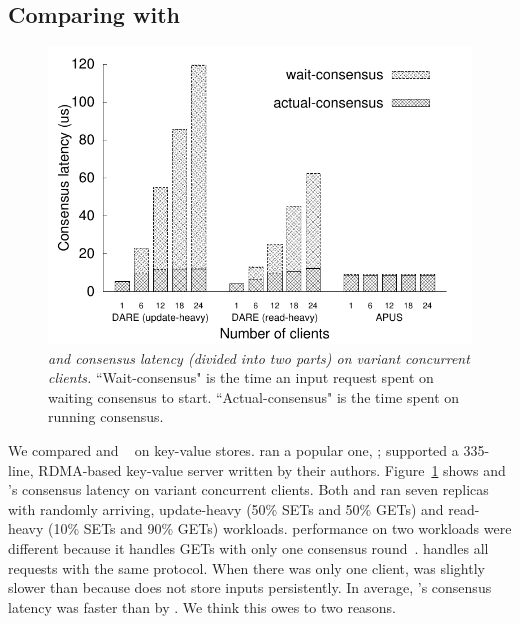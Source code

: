 \subsection{Comparing with \dare}
\label{sec:eval-dare}

\begin{figure}[b]
\centering
\vspace{-.35in}
\includegraphics[width=.4\textwidth]{figures/server-processing-compare}
\vspace{-.1in}
\caption{{\em \xxx and \dare consensus latency (divided into two parts) on 
variant concurrent clients.} 
``Wait-consensus" is the time an input request spent on waiting consensus to 
start. ``Actual-consensus" is the time spent on running consensus.}
\label{fig:compare}
\vspace{-.1in}
\end{figure}




We compared \xxx and \dare~\cite{dare:hpdc15} on key-value stores. \xxx ran a 
popular one, \redis; \dare supported a 335-line, RDMA-based key-value 
server written by their authors. Figure~\ref{fig:compare} shows \xxx and 
\dare's consensus latency on variant concurrent clients. Both \xxx and \dare ran 
seven replicas with randomly arriving, update-heavy (50\% SETs and 50\% GETs) 
and read-heavy (10\% SETs and 90\% GETs) workloads. \dare performance on two 
workloads were different because it handles GETs with only one consensus 
round~\cite{dare:hpdc15}. \xxx handles all requests with the same protocol. When 
there was only one client, \xxx was slightly slower than \dare because \dare 
does not store inputs persistently. In average, \xxx's 
consensus latency was faster than \dare by \fasterDARE. We think this owes to 
two reasons.

